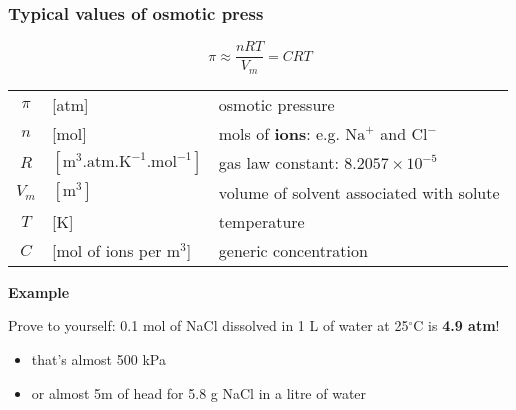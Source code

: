 \begin{frame}\frametitle{Typical values of osmotic press}
	\begin{exampleblock}{}
		\[
			\pi \approx \dfrac{nRT}{V_m} = CRT
		\]
	\end{exampleblock}
	\begin{tabular}{cll}
		$\pi$		&	[atm] 													& osmotic pressure \\
		$n$ 		&  	[mol]													& mols of \textbf{ions}: e.g. $\text{Na}^{+}$ and $\text{Cl}^{-}$\\
		$R$			&	$[\text{m}^3\text{.atm.K}^{-1}\text{.mol}^{-1}]$ 		& gas law constant: $8.2057 \times 10^{-5}$\\
		$V_m$ 		&  	$[\text{m}^{3}]$										& volume of solvent associated with solute\\
		$T$ 		&  	[K]														& temperature\\
		$C$ 		&  	[mol of ions per m$^{3}$]								& generic concentration
	\end{tabular}

	\vspace{12pt}
	\textbf{Example}

	\vspace{6pt}
	Prove to yourself: 0.1 mol of NaCl dissolved in 1 L of water at 25$^\circ$C is \textbf{4.9 atm}!
	\begin{itemize}
		\item	that's almost 500 kPa
		\item	or almost 5m of head for 5.8 g NaCl in a litre of water
	\end{itemize}
\end{frame}

